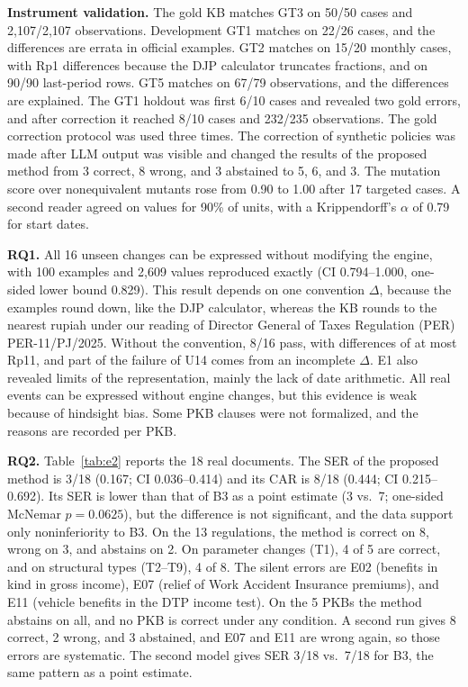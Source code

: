 \documentclass[conference]{IEEEtran}
\begin{document}
\textbf{Instrument validation.} The gold KB matches GT3 on 50/50 cases and 2,107/2,107 observations. Development GT1 matches on 22/26 cases, and the differences are errata in official examples. GT2 matches on 15/20 monthly cases, with Rp1 differences because the DJP calculator truncates fractions, and on 90/90 last-period rows. GT5 matches on 67/79 observations, and the differences are explained. The GT1 holdout was first 6/10 cases and revealed two gold errors, and after correction it reached 8/10 cases and 232/235 observations. The gold correction protocol was used three times. The correction of synthetic policies was made after LLM output was visible and changed the results of the proposed method from 3 correct, 8 wrong, and 3 abstained to 5, 6, and 3. The mutation score over nonequivalent mutants rose from 0.90 to 1.00 after 17 targeted cases. A second reader agreed on values for 90\% of units, with a Krippendorff's $\alpha$ of 0.79 for start dates.

\textbf{RQ1.} All 16 unseen changes can be expressed without modifying the engine, with 100 examples and 2,609 values reproduced exactly (CI 0.794--1.000, one-sided lower bound 0.829). This result depends on one convention $\Delta$, because the examples round down, like the DJP calculator, whereas the KB rounds to the nearest rupiah under our reading of Director General of Taxes Regulation (PER) PER-11/PJ/2025. Without the convention, 8/16 pass, with differences of at most Rp11, and part of the failure of U14 comes from an incomplete $\Delta$. E1 also revealed limits of the representation, mainly the lack of date arithmetic. All real events can be expressed without engine changes, but this evidence is weak because of hindsight bias. Some PKB clauses were not formalized, and the reasons are recorded per PKB.

\textbf{RQ2.} Table~\ref{tab:e2} reports the 18 real documents. The SER of the proposed method is 3/18 (0.167; CI 0.036--0.414) and its CAR is 8/18 (0.444; CI 0.215--0.692). Its SER is lower than that of B3 as a point estimate (3 vs.\ 7; one-sided McNemar $p = 0.0625$), but the difference is not significant, and the data support only noninferiority to B3. On the 13 regulations, the method is correct on 8, wrong on 3, and abstains on 2. On parameter changes (T1), 4 of 5 are correct, and on structural types (T2--T9), 4 of 8. The silent errors are E02 (benefits in kind in gross income), E07 (relief of Work Accident Insurance premiums), and E11 (vehicle benefits in the DTP income test). On the 5 PKBs the method abstains on all, and no PKB is correct under any condition. A second run gives 8 correct, 2 wrong, and 3 abstained, and E07 and E11 are wrong again, so those errors are systematic. The second model gives SER 3/18 vs.\ 7/18 for B3, the same pattern as a point estimate.
\end{document}
